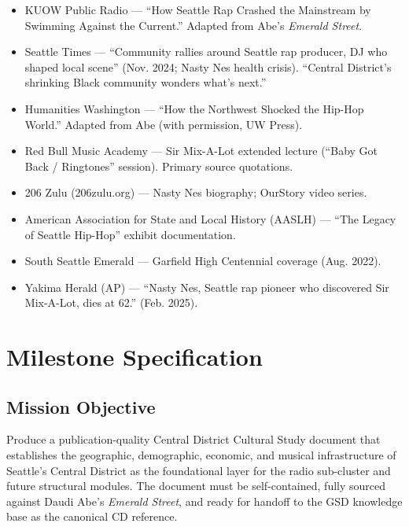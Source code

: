 \documentclass[11pt,letterpaper]{article}
\newcommand{\stageheader}[2]{%
  \noindent\colorbox{#2}{\makebox[\textwidth][l]{%
    \textcolor{white}{\bfseries\sffamily\hspace{6pt}#1\hspace{6pt}}}}%
  \vspace{0.5em}\par%
}
\begin{document}
\begin{itemize}
  \item KUOW Public Radio --- ``How Seattle Rap Crashed the Mainstream by Swimming Against the Current.'' Adapted from Abe's \textit{Emerald Street}.
  \item Seattle Times --- ``Community rallies around Seattle rap producer, DJ who shaped local scene'' (Nov. 2024; Nasty Nes health crisis). ``Central District's shrinking Black community wonders what's next.''
  \item Humanities Washington --- ``How the Northwest Shocked the Hip-Hop World.'' Adapted from Abe (with permission, UW Press).
  \item Red Bull Music Academy --- Sir Mix-A-Lot extended lecture (``Baby Got Back / Ringtones'' session). Primary source quotations.
  \item 206 Zulu (206zulu.org) --- Nasty Nes biography; OurStory video series.
  \item American Association for State and Local History (AASLH) --- ``The Legacy of Seattle Hip-Hop'' exhibit documentation.
  \item South Seattle Emerald --- Garfield High Centennial coverage (Aug. 2022).
  \item Yakima Herald (AP) --- ``Nasty Nes, Seattle rap pioneer who discovered Sir Mix-A-Lot, dies at 62.'' (Feb. 2025).
\end{itemize}

\newpage

\stageheader{STAGE 3 --- MISSION PACKAGE}{tertiary}

\section{Milestone Specification}

\subsection{Mission Objective}

Produce a publication-quality Central District Cultural Study document that establishes the geographic, demographic, economic, and musical infrastructure of Seattle's Central District as the foundational layer for the radio sub-cluster and future structural modules. The document must be self-contained, fully sourced against Daudi Abe's \textit{Emerald Street}, and ready for handoff to the GSD knowledge base as the canonical CD reference.
\end{document}

